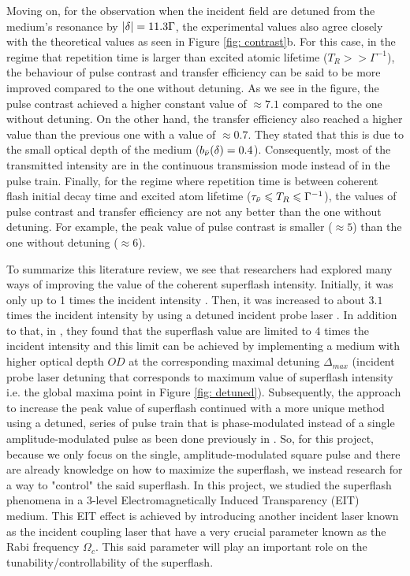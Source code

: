 Moving on, for the observation when the incident field are detuned from the medium's resonance by $\abs{\delta} = 11.3 \Gamma$, the experimental values also agree closely with the theoretical values as seen in Figure \ref{fig: contrast}b. For this case, in the regime that repetition time is larger than excited atomic lifetime ($T_{R} >> \Gamma^{-1}$), the behaviour of pulse contrast and transfer efficiency can be said to be more improved compared to the one without detuning. As we see in the figure, the pulse contrast achieved a higher constant value of $\approx 7.1$ compared to the one without detuning. On the other hand, the transfer efficiency also reached a higher value than the previous one with a value of $\approx 0.7$. They stated that this is due to the small optical depth of the medium ($b_{\Bar{\nu}}(\delta) = 0.4$). Consequently, most of the transmitted intensity are in the continuous transmission mode instead of in the pulse train. Finally, for the regime where repetition time is between coherent flash initial decay time and excited atom lifetime ($\tau_{\Bar{\nu}} \leqslant T_{R} \leqslant \Gamma^{-1}$), the values of pulse contrast and transfer efficiency are not any better than the one without detuning. For example, the peak value of pulse contrast is smaller ($\approx 5$) than the one without detuning ($\approx 6$).

To summarize this literature review, we see that researchers had explored many ways of improving the value of the coherent superflash intensity. Initially, it was only up to 1 times the incident intensity \cite{Chalony2011}. Then, it was increased to about $3.1$ times the incident intensity by using a detuned incident probe laser \cite{Kwong2014}. In addition to that, in \cite{Kwong2014}, they found that the superflash value are limited to $4$ times the incident intensity and this limit can be achieved by implementing a medium with higher optical depth $OD$ at the corresponding maximal detuning $\Delta_{max}$ (incident probe laser detuning that corresponds to maximum value of superflash intensity i.e. the global maxima point in Figure \ref{fig: detuned}). Subsequently, the approach to increase the peak value of superflash continued with a more unique method using a detuned, series of pulse train that is phase-modulated \cite{Kwong2015} instead of a single amplitude-modulated pulse as been done previously in . So, for this project, because we only focus on the single, amplitude-modulated square pulse and there are already knowledge on how to maximize the superflash, we instead research for a way to "control" the said superflash. In this project, we studied the superflash phenomena in a 3-level Electromagnetically Induced Transparency (EIT) medium. This EIT effect is achieved by introducing another incident laser known as the incident coupling laser that have a very crucial parameter known as the Rabi frequency $\Omega_{c}$. This said parameter will play an important role on the tunability/controllability of the superflash.
